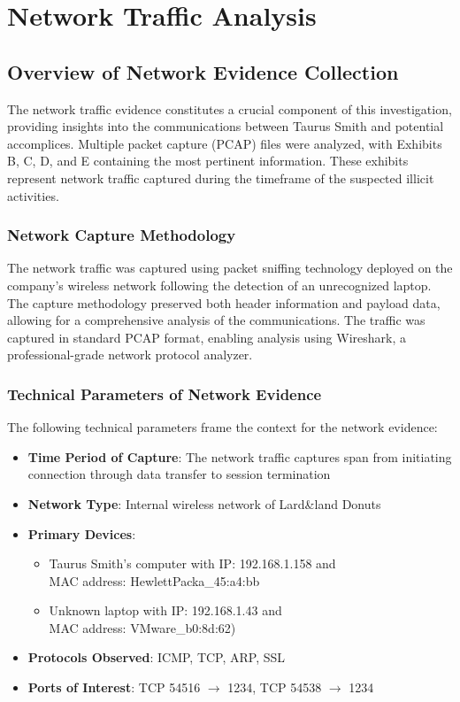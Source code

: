 \chapter{Network Traffic Analysis}

\section{Overview of Network Evidence Collection}
The network traffic evidence constitutes a crucial component of this investigation, providing insights into the communications between Taurus Smith and potential accomplices. Multiple packet capture (PCAP) files were analyzed, with Exhibits B, C, D, and E containing the most pertinent information. These exhibits represent network traffic captured during the timeframe of the suspected illicit activities.

\subsection{Network Capture Methodology}
The network traffic was captured using packet sniffing technology deployed on the company's wireless network following the detection of an unrecognized laptop. The capture methodology preserved both header information and payload data, allowing for a comprehensive analysis of the communications. The traffic was captured in standard PCAP format, enabling analysis using Wireshark, a professional-grade network protocol analyzer.

\subsection{Technical Parameters of Network Evidence}
The following technical parameters frame the context for the network evidence:

\begin{itemize}
    \item \textbf{Time Period of Capture}: The network traffic captures span from initiating connection through data transfer to session termination
    \item \textbf{Network Type}: Internal wireless network of Lard\&land Donuts
    \item \textbf{Primary Devices}: 
        \begin{itemize}
            \item Taurus Smith's computer with IP: 192.168.1.158 and \\
            MAC address: HewlettPacka\_45:a4:bb
            \item Unknown laptop with IP: 192.168.1.43 and \\ MAC address: VMware\_b0:8d:62)
        \end{itemize}
    \item \textbf{Protocols Observed}: ICMP, TCP, ARP, SSL
    \item \textbf{Ports of Interest}: TCP 54516 $\rightarrow$ 1234, TCP 54538 $\rightarrow$ 1234
\end{itemize}

